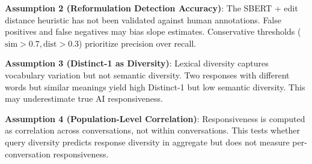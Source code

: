 \textbf{Assumption 2 (Reformulation Detection Accuracy)}: The SBERT + edit distance heuristic has not been validated against human annotations. False positives and false negatives may bias slope estimates. Conservative thresholds ($\text{sim} > 0.7, \text{dist} > 0.3$) prioritize precision over recall.

\textbf{Assumption 3 (Distinct-1 as Diversity)}: Lexical diversity captures vocabulary variation but not semantic diversity. Two responses with different words but similar meanings yield high Distinct-1 but low semantic diversity. This may underestimate true AI responsiveness.

\textbf{Assumption 4 (Population-Level Correlation)}: Responsiveness is computed as correlation across conversations, not within conversations. This tests whether query diversity predicts response diversity in aggregate but does not measure per-conversation responsiveness.
